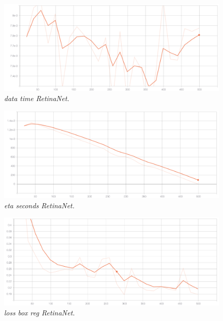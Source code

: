 \begin{figure}[h!]
\begin{center} 
\includegraphics[scale=0.35]{figures/data_time_retinanet_1}
\caption{\small \sl data time RetinaNet. \label{fig:data_time_retinanet}}
\end{center}
\end{figure}

\begin{figure}[h!]
\begin{center} 
\includegraphics[scale=0.35]{figures/eta_seconds_retinanet_2}
\caption{\small \sl eta seconds RetinaNet. \label{fig:eta_seconds_retinanet}}
\end{center}
\end{figure}

\begin{figure}[h!]
\begin{center} 
\includegraphics[scale=0.35]{figures/loss_box_reg_retinanet_3}
\caption{\small \sl loss box reg RetinaNet. \label{fig:loss_box_reg_retinanet}}
\end{center}
\end{figure}

